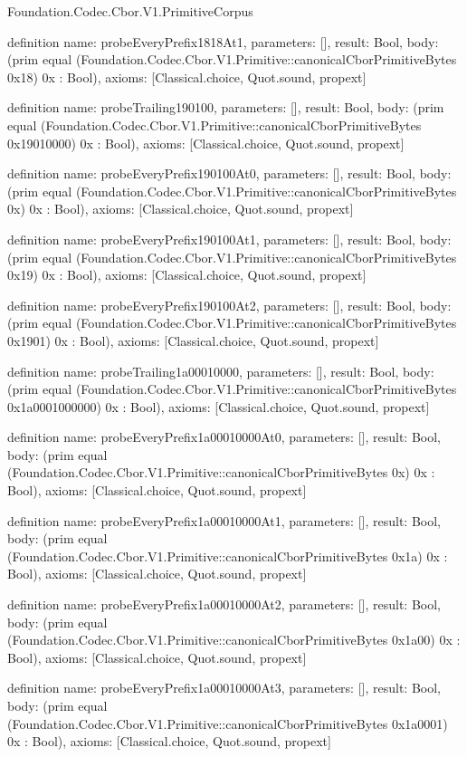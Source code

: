 \begin{lexlean}{Foundation.Codec.Cbor.V1.PrimitiveCorpus}
\begin{semanticmodule}
definition{
  name: probeEveryPrefix1818At1,
  parameters: [],
  result: Bool,
  body: (prim equal (Foundation.Codec.Cbor.V1.Primitive::canonicalCborPrimitiveBytes 0x18) 0x : Bool),
  axioms: [Classical.choice, Quot.sound, propext]
}

definition{
  name: probeTrailing190100,
  parameters: [],
  result: Bool,
  body: (prim equal (Foundation.Codec.Cbor.V1.Primitive::canonicalCborPrimitiveBytes 0x19010000) 0x : Bool),
  axioms: [Classical.choice, Quot.sound, propext]
}

definition{
  name: probeEveryPrefix190100At0,
  parameters: [],
  result: Bool,
  body: (prim equal (Foundation.Codec.Cbor.V1.Primitive::canonicalCborPrimitiveBytes 0x) 0x : Bool),
  axioms: [Classical.choice, Quot.sound, propext]
}

definition{
  name: probeEveryPrefix190100At1,
  parameters: [],
  result: Bool,
  body: (prim equal (Foundation.Codec.Cbor.V1.Primitive::canonicalCborPrimitiveBytes 0x19) 0x : Bool),
  axioms: [Classical.choice, Quot.sound, propext]
}

definition{
  name: probeEveryPrefix190100At2,
  parameters: [],
  result: Bool,
  body: (prim equal (Foundation.Codec.Cbor.V1.Primitive::canonicalCborPrimitiveBytes 0x1901) 0x : Bool),
  axioms: [Classical.choice, Quot.sound, propext]
}

definition{
  name: probeTrailing1a00010000,
  parameters: [],
  result: Bool,
  body: (prim equal (Foundation.Codec.Cbor.V1.Primitive::canonicalCborPrimitiveBytes 0x1a0001000000) 0x : Bool),
  axioms: [Classical.choice, Quot.sound, propext]
}

definition{
  name: probeEveryPrefix1a00010000At0,
  parameters: [],
  result: Bool,
  body: (prim equal (Foundation.Codec.Cbor.V1.Primitive::canonicalCborPrimitiveBytes 0x) 0x : Bool),
  axioms: [Classical.choice, Quot.sound, propext]
}

definition{
  name: probeEveryPrefix1a00010000At1,
  parameters: [],
  result: Bool,
  body: (prim equal (Foundation.Codec.Cbor.V1.Primitive::canonicalCborPrimitiveBytes 0x1a) 0x : Bool),
  axioms: [Classical.choice, Quot.sound, propext]
}

definition{
  name: probeEveryPrefix1a00010000At2,
  parameters: [],
  result: Bool,
  body: (prim equal (Foundation.Codec.Cbor.V1.Primitive::canonicalCborPrimitiveBytes 0x1a00) 0x : Bool),
  axioms: [Classical.choice, Quot.sound, propext]
}

definition{
  name: probeEveryPrefix1a00010000At3,
  parameters: [],
  result: Bool,
  body: (prim equal (Foundation.Codec.Cbor.V1.Primitive::canonicalCborPrimitiveBytes 0x1a0001) 0x : Bool),
  axioms: [Classical.choice, Quot.sound, propext]
}


\end{semanticmodule}
\end{lexlean}
